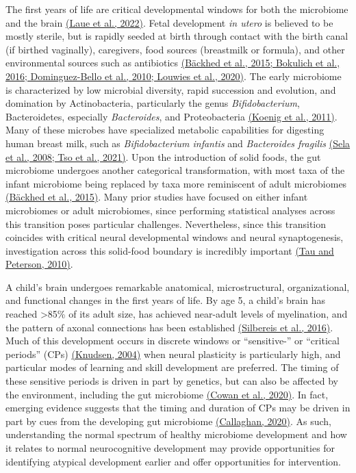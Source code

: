 \documentclass[
]{article}
\begin{document}
The first years of life are critical developmental windows for both the
microbiome and the brain
\href{https://www.zotero.org/google-docs/?XTqhlm}{(Laue et al., 2022)}.
Fetal development \emph{in utero} is believed to be mostly sterile, but
is rapidly seeded at birth through contact with the birth canal (if
birthed vaginally), caregivers, food sources (breastmilk or formula),
and other environmental sources such as antibiotics
\href{https://www.zotero.org/google-docs/?X6N0f4}{(Bäckhed et al., 2015;
Bokulich et al., 2016; Dominguez-Bello et al., 2010; Louwies et al.,
2020)}. The early microbiome is characterized by low microbial
diversity, rapid succession and evolution, and domination by
Actinobacteria, particularly the genus \emph{Bifidobacterium},
Bacteroidetes, especially \emph{Bacteroides}, and Proteobacteria
\href{https://www.zotero.org/google-docs/?VG43uh}{(Koenig et al.,
2011)}. Many of these microbes have specialized metabolic capabilities
for digesting human breast milk, such as \emph{Bifidobacterium infantis}
and \emph{Bacteroides fragilis}
\href{https://www.zotero.org/google-docs/?1dKzKj}{(Sela et al., 2008;
Tso et al., 2021)}. Upon the introduction of solid foods, the gut
microbiome undergoes another categorical transformation, with most taxa
of the infant microbiome being replaced by taxa more reminiscent of
adult microbiomes
\href{https://www.zotero.org/google-docs/?V3lY3p}{(Bäckhed et al.,
2015)}. Many prior studies have focused on either infant microbiomes or
adult microbiomes, since performing statistical analyses across this
transition poses particular challenges. Nevertheless, since this
transition coincides with critical neural developmental windows and
neural synaptogenesis, investigation across this solid-food boundary is
incredibly important
\href{https://www.zotero.org/google-docs/?d29bv8}{(Tau and Peterson,
2010)}.

A child's brain undergoes remarkable anatomical, microstructural,
organizational, and functional changes in the first years of life. By
age 5, a child's brain has reached \textgreater85\% of its adult size,
has achieved near-adult levels of myelination, and the pattern of axonal
connections has been established
\href{https://www.zotero.org/google-docs/?1jUZOO}{(Silbereis et al.,
2016)}. Much of this development occurs in discrete windows or
``sensitive-'' or ``critical periods'' (CPs)
\href{https://www.zotero.org/google-docs/?w4Pcze}{(Knudsen, 2004)} when
neural plasticity is particularly high, and particular modes of learning
and skill development are preferred. The timing of these sensitive
periods is driven in part by genetics, but can also be affected by the
environment, including the gut microbiome
\href{https://www.zotero.org/google-docs/?KTm9lQ}{(Cowan et al., 2020)}.
In fact, emerging evidence suggests that the timing and duration of CPs
may be driven in part by cues from the developing gut microbiome
\href{https://www.zotero.org/google-docs/?mAD1ne}{(Callaghan, 2020)}. As
such, understanding the normal spectrum of healthy microbiome
development and how it relates to normal neurocognitive development may
provide opportunities for identifying atypical development earlier and
offer opportunities for intervention.
\end{document}
